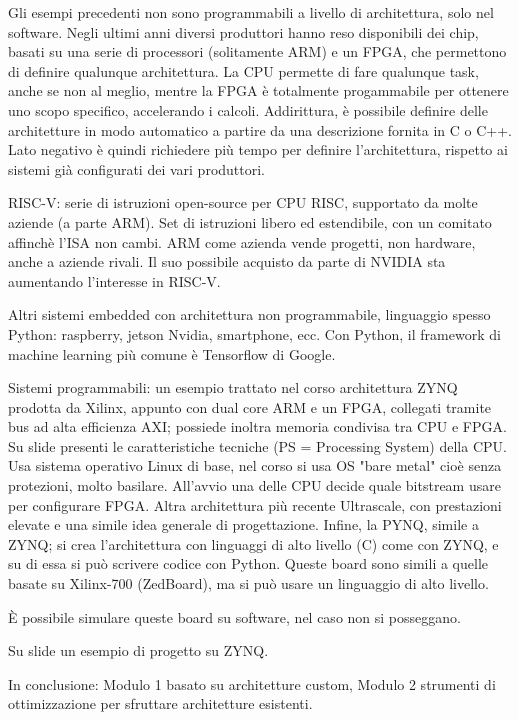 \documentclass[a4paper,oneside]{book}
\begin{document}
    Gli esempi precedenti non sono programmabili a livello di architettura, solo nel software.
    Negli ultimi anni diversi produttori hanno reso disponibili dei chip, basati su una serie 
    di processori (solitamente ARM) e un FPGA, che permettono di definire qualunque architettura. 
    La CPU permette di fare qualunque task, anche se non al meglio, mentre la FPGA è totalmente 
    progammabile per ottenere uno scopo specifico, accelerando i calcoli. 
    Addirittura, è possibile definire delle architetture in modo automatico a partire da una descrizione 
    fornita in C o C++. Lato negativo è quindi richiedere più tempo per definire l'architettura, 
    rispetto ai sistemi già configurati dei vari produttori.

    RISC-V: serie di istruzioni open-source per CPU RISC, supportato da molte aziende (a parte ARM).
    Set di istruzioni libero ed estendibile, con un comitato affinchè l'ISA non cambi.
    ARM come azienda vende progetti, non hardware, anche a aziende rivali. Il suo possibile acquisto 
    da parte di NVIDIA sta aumentando l'interesse in RISC-V.

    Altri sistemi embedded con architettura non programmabile, linguaggio spesso Python: raspberry, 
    jetson Nvidia, smartphone, ecc. Con Python, il framework di machine learning più comune è 
    Tensorflow di Google.

    Sistemi programmabili: un esempio trattato nel corso architettura ZYNQ prodotta da Xilinx, appunto 
    con dual core ARM e un FPGA, collegati tramite bus ad alta efficienza AXI; possiede inoltra memoria 
    condivisa tra CPU e FPGA. Su slide presenti le caratteristiche tecniche (PS = Processing System) della 
    CPU. Usa sistema operativo Linux di base, nel corso si usa OS "bare metal" cioè senza protezioni, molto 
    basilare. All'avvio una delle CPU decide quale bitstream usare per configurare FPGA. 
    Altra architettura più recente Ultrascale, con prestazioni elevate e una simile idea generale di 
    progettazione. Infine, la PYNQ, simile a ZYNQ; si crea l'architettura con linguaggi di alto livello (C) 
    come con ZYNQ, e su di essa si può scrivere codice con Python. Queste board sono simili a quelle basate su 
    Xilinx-700 (ZedBoard), ma si può usare un linguaggio di alto livello.

    È possibile simulare queste board su software, nel caso non si posseggano.

    Su slide un esempio di progetto su ZYNQ.

    In conclusione: Modulo 1 basato su architetture custom, Modulo 2 strumenti di ottimizzazione per sfruttare 
    architetture esistenti.
\end{document}
